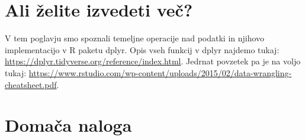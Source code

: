 \documentclass[
]{book}
\begin{document}
\hypertarget{ali-ux17eelite-izvedeti-veux10d}{%
\section{Ali želite izvedeti več?}\label{ali-ux17eelite-izvedeti-veux10d}}

V tem poglavju smo spoznali temeljne operacije nad podatki in njihovo implementacijo v R paketu dplyr. Opis vseh funkcij v dplyr najdemo tukaj: \url{https://dplyr.tidyverse.org/reference/index.html}. Jedrnat povzetek pa je na voljo tukaj: \url{https://www.rstudio.com/wp-content/uploads/2015/02/data-wrangling-cheatsheet.pdf}.

\hypertarget{domaux10da-naloga}{%
\section{Domača naloga}\label{domaux10da-naloga}}
\end{document}
